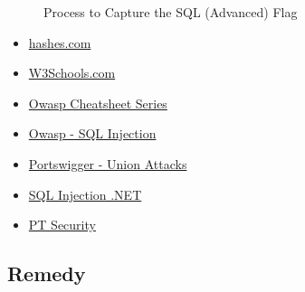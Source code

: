 \begin{figure}[!htb]
     \quad
    \caption[Flag 01 Method]{Process to Capture the SQL (Advanced) Flag} %
    \label{fig:flag00 method}
\end{figure}

\begin{itemize}
    \item \href{https://hashes.com/en}{hashes.com}
    \item \href{https://www.w3schools.com/sql/sql\_injection.asp}{W3Schools.com}
    \item \href{https://cheatsheetseries.owasp.org/cheatsheets/Injection\_Prevention\_Cheat\_Sheet.html}{Owasp Cheatsheet Series}
    \item \href{https://owasp.org/www-community/attacks/SQL\_Injection}{Owasp - SQL Injection}
    \item \href{https://portswigger.net/web-security/sql-injection/union-attacks}{Portswigger - Union Attacks}
    \item \href{https://www.sqlinjection.net/table-names/}{SQL Injection .NET}
    \item \href{https://www.ptsecurity.com/ww-en/analytics/knowledge-base/how-to-prevent-sql-injection-attacks/}{PT Security}
\end{itemize}

\subsection{Remedy}

